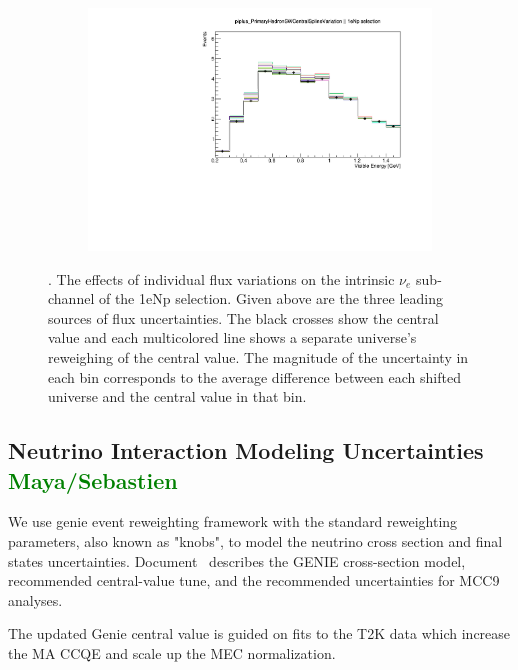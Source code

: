 \documentclass[a4paper]{article}
\begin{document}
\begin{figure}[ht]
\begin{center}
\begin{subfigure}[b]{0.33\textwidth}
    \end{subfigure}
    \begin{subfigure}[b]{0.33\textwidth}
    \centering
    \includegraphics[width=1.00\textwidth]{systvariations/Variation_nue_reco_e_genietune_run1_piplus_PrimaryHadronSWCentralSplineVariation_nu_uBooNE_nue_intrinsic.pdf}
    \end{subfigure}
\caption{\label{fig:fluxsystvars}. The effects of individual flux variations on the intrinsic $\nu_e$ sub-channel of the 1eNp selection. Given above are the three leading sources of flux uncertainties. The black crosses show the central value and each multicolored line shows a separate universe's reweighing of the central value. The magnitude of the  uncertainty in each bin corresponds to the average difference between each shifted universe and the central value in that bin.}
\end{center}
\end{figure}

\subsection{Neutrino Interaction Modeling Uncertainties \textcolor{green}{Maya/Sebastien}}
We use genie event reweighting framework with the standard reweighting parameters, also known as "knobs", to model the neutrino cross section and final states uncertainties. Document~\cite{bib:geniesupportnote} describes the GENIE cross-section model, recommended central-value tune, and the recommended uncertainties for MCC9 analyses. 

The updated Genie central value is guided on fits to the T2K data which increase the MA CCQE and scale up the MEC normalization.
\end{document}
